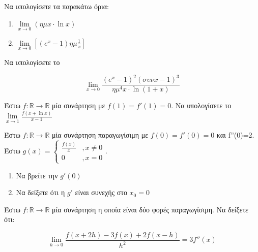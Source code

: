 \documentclass{presentation}
\begin{document}
\begin{askisi}
  Να υπολογίσετε τα παρακάτω όρια:
  \begin{enumerate}[<+->]
    \item $\lim\limits_{x \to 0}{ \left( ημx\cdot \ln x \right)  }$
    \item $\lim\limits_{x \to 0}{ \left[ (e^x-1)ημ\frac{1}{x} \right]  }$
  \end{enumerate}
\end{askisi}

\begin{askisi}
  Να υπολογίσετε το

  $$\lim\limits_{x \to 0}{ \frac{(e^x-1)^2(συνx-1)^3}{ημ^4x\cdot \ln (1+x)}  }$$
\end{askisi}

\begin{askisi}
  Έστω $f:\mathbb{R}\to\mathbb{R}$ μία συνάρτηση με $f(1)=f'(1)=0$. Να υπολογίσετε το $\lim\limits_{x \to 1}{ \frac{f(x+\ln x)}{x-1}}$
\end{askisi}

\begin{askisi}
  Έστω $f:\mathbb{R}\to\mathbb{R}$ μία συνάρτηση παραγωγίσιμη με $f(0)=f'(0)=0$ και f''(0)=2. Έστω $g(x)=\begin{cases}\frac{f(x)}{x} & ,x\ne 0 \\
             0              & ,x=0\end{cases}$.

  \begin{enumerate}[<+->]
    \item Να βρείτε την $g'(0)$
    \item Να δείξετε ότι η $g'$ είναι συνεχής στο $x_0=0$
  \end{enumerate}
\end{askisi}

\begin{askisi}
  Έστω $f:\mathbb{R}\to\mathbb{R}$ μία συνάρτηση η οποία είναι δύο φορές παραγωγίσιμη. Να δείξετε ότι:

  $$\lim\limits_{h \to 0}{ \frac{f(x+2h)-3f(x)+2f(x-h)}{h^2} }=3f''(x)$$
\end{askisi}


\moodle
\end{document}

